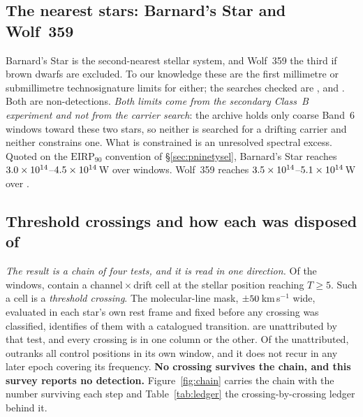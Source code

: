 \subsection{The nearest stars: Barnard's Star and Wolf~359}
\label{sec:barnardswolf}

Barnard's Star is the second-nearest stellar system, and Wolf~359 the third
if brown dwarfs are excluded. To our knowledge these are the first
millimetre or submillimetre technosignature limits for either; the searches
checked are \citet{Enriquez2017}, \citet{Price2020} and
\citet{Margot2023}. Both are non-detections. \emph{Both limits come from the
secondary Class~B experiment and not from the carrier search}: the archive
holds only coarse Band~6 windows toward these two stars, so neither is
searched for a drifting carrier and neither constrains one. What is
constrained is an unresolved spectral excess. Quoted on the
$\mathrm{EIRP}_{90}$ convention of \S\ref{sec:pninetysel}, Barnard's Star
reaches $3.0\times10^{14}$--$4.5\times10^{14}$\,W over \NWinBarn{}
windows. Wolf~359 reaches
$3.5\times10^{14}$--$5.1\times10^{14}$\,W over \NWinWolf.

\subsection{Threshold crossings and how each was disposed of}
\label{sec:technosearch}

\emph{The result is a chain of four tests, and it is read in one direction.}
Of the \NWindows{} windows, \NCross{} contain a channel\,$\times$\,drift
cell at the stellar position reaching $T\geq5$. Such a cell is a
\emph{threshold crossing}. The molecular-line mask,
$\pm50$\,km\,s$^{-1}$ wide, evaluated in each star's own rest
frame and fixed before any crossing was classified, identifies
\NAttributed{} of them with a catalogued transition.
\NUnattributed{} are unattributed by that test, and every crossing is in one
column or the other. Of the unattributed, \NUnattrRankFlagged{} outranks
all \NCtrl{} control positions in its own window, and it does not recur in
any later epoch covering its frequency. \textbf{No crossing survives the
chain, and this survey reports no detection.}
Figure~\ref{fig:chain} carries the chain with the number surviving each
step and Table~\ref{tab:ledger} the crossing-by-crossing ledger behind it.

